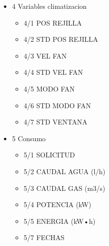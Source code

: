 \begin{multicols}{2} 
\begin{flushleft} 
\begin{itemize}
\item{4 Variables climatizacion}
\begin{itemize}
\item{4/1 POS REJILLA}
\item{4/2 STD POS REJILLA}
\item{4/3 VEL FAN}
\item{4/4 STD VEL FAN}
\item{4/5 MODO FAN}
\item{4/6 STD MODO FAN}
\item{4/7 STD VENTANA}
\end{itemize} 
\end{itemize} 
\end{flushleft}

\begin{flushright} 
\begin{itemize}
\item{5 Consumo}
\begin{itemize}
\item{5/1 SOLICITUD}
\item{5/2 CAUDAL AGUA (l/h)}
\item{5/3 CAUDAL GAS (m3/s)}
\item{5/4 POTENCIA (kW)}
\item{5/5 ENERGIA (kW•h)}
\item{5/7 FECHAS}
\end{itemize} 
\end{itemize} 
\end{flushright} 
\end{multicols} 

\newpage

